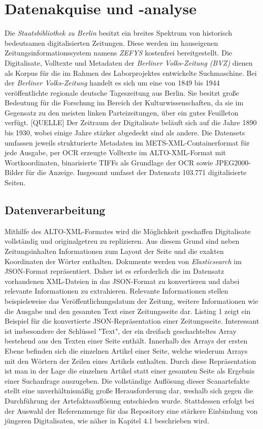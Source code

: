 \documentclass[11pt,a4paper, halfparskip]{scrartcl}
\begin{document}
\section{Datenakquise und -analyse}

Die \textit{Staatsbibliothek zu Berlin} besitzt ein breites Spektrum von historisch bedeutsamen digitalisierten Zeitungen.
Diese werden im hauseigenen Zeitungsinformationssystem namens \textit{ZEFYS} kostenfrei bereitgestellt.
Die Digitalisate, Volltexte und Metadaten der \textit{Berliner Volks-Zeitung (BVZ)} dienen als Korpus für die im Rahmen des Laborprojektes entwickelte Suchmaschine.
Bei der \textit{Berliner Volks-Zeitung} handelt es sich um eine von 1849 bis 1944 veröffentlichte regionale deutsche Tageszeitung aus Berlin.
Sie besitzt große Bedeutung für die Forschung im Bereich der Kulturwissenschaften, da sie im Gegensatz zu den meisten linken Parteizeitungen, über ein gutes Feuilleton verfügt. [QUELLE]
Der Zeitraum der Digitalisate beläuft sich auf die Jahre 1890 bis 1930, wobei einige Jahre stärker abgedeckt sind als andere.
Die Datensets umfassen jeweils strukturierte Metadaten im METS-XML-Containerformat für jede Ausgabe, per OCR erzeugte Volltexte im ALTO-XML-Format mit Wortkoordinaten, binarisierte TIFFs als Grundlage der OCR sowie JPEG2000-Bilder für die Anzeige.
Insgesamt umfasst der Datensatz 103.771 digitalisierte Seiten.

\subsection{Datenverarbeitung}

Mithilfe des ALTO-XML-Formates wird die Möglichkeit geschaffen Digitalisate vollständig und originalgetreu zu replizieren. 
Aus diesem Grund sind neben Zeitungsinhalten Informationen zum Layout der Seite und die exakten Koordinaten der Wörter enthalten.
Dokumente werden von \textit{Elasticsearch} im JSON-Format repräsentiert.
Daher ist es erforderlich die im Datensatz vorhandenen XML-Dateien in das JSON-Format zu konvertieren und dabei relevante Informationen zu extrahieren.
Relevante Informationen stellen beispielsweise das Veröffentlichungsdatum der Zeitung, weitere Informationen wie die Ausgabe und den gesamten Text einer Zeitungsseite dar.
Listing 1 zeigt ein Beispiel für die konvertierte JSON-Repräsentation einer Zeitungsseite.
Interessant ist insbesondere der Schlüssel "Text", der ein dreifach geschachteltes Array bestehend aus den Texten einer Seite enthält.
Innerhalb des Arrays der ersten Ebene befinden sich die einzelnen Artikel einer Seite, welche wiederum Arrays mit den Wörtern der Zeilen eines Artikels enthalten.
Durch diese Repräsentation ist man in der Lage die einzelnen Artikel statt einer gesamten Seite als Ergebnis einer Suchanfrage auszugeben.
Die vollständige Auflösung dieser Scanartefakte stellt eine unverhältnismäßig große Herausforderung dar, weshalb sich gegen die Durchführung der Artefaktsauflösung entschieden wurde. 
Stattdessen erfolgt bei der Auswahl der Referenzmenge für das Repository eine stärkere Einbindung von jüngeren Digitalisaten, wie näher in Kapitel 4.1 beschrieben wird.
\end{document}
